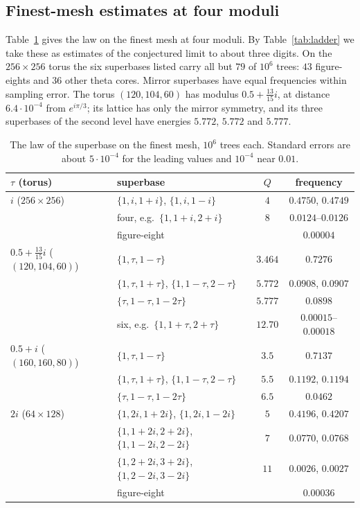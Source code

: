 \documentclass[11pt]{amsart}
\theoremstyle{definition}
\theoremstyle{remark}
\begin{document}
\subsection*{Finest-mesh estimates at four moduli}
Table~\ref{tab:limit} gives the law on the finest mesh at four moduli. By Table~\ref{tab:ladder} we take these as
estimates of the conjectured limit to about three digits. On the $256\times256$ torus the six superbases listed carry
all but $79$ of $10^6$ trees: $43$ figure-eights and $36$ other theta cores. Mirror superbases have equal frequencies
within sampling error. The torus $(120,104,60)$ has modulus $0.5+\tfrac{13}{15}i$, at distance $6.4\cdot10^{-4}$ from
$e^{i\pi/3}$; its lattice has only the mirror symmetry, and its three superbases of the second level have energies
$5.772$, $5.772$ and $5.777$.

\begin{table}[tbp]
\centering
\small
\begin{tabular}{llcc}
\toprule
$\tau$ (torus) & superbase & $Q$ & frequency\\\midrule
$i$ ($256\times256$) & $\{1,i,1+i\}$, $\{1,i,1-i\}$ & $4$ & $0.4750$, $0.4749$\\
 & four, e.g.\ $\{1,1+i,2+i\}$ & $8$ & $0.0124$--$0.0126$\\
 & figure-eight & & $0.00004$\\
$0.5+\tfrac{13}{15}i$ ($(120,104,60)$) & $\{1,\tau,1-\tau\}$ & $3.464$ & $0.7276$\\
 & $\{1,\tau,1+\tau\}$, $\{1,1-\tau,2-\tau\}$ & $5.772$ & $0.0908$, $0.0907$\\
 & $\{\tau,1-\tau,1-2\tau\}$ & $5.777$ & $0.0898$\\
 & six, e.g.\ $\{1,1+\tau,2+\tau\}$ & $12.70$ & $0.00015$--$0.00018$\\
$0.5+i$ ($(160,160,80)$) & $\{1,\tau,1-\tau\}$ & $3.5$ & $0.7137$\\
 & $\{1,\tau,1+\tau\}$, $\{1,1-\tau,2-\tau\}$ & $5.5$ & $0.1192$, $0.1194$\\
 & $\{\tau,1-\tau,1-2\tau\}$ & $6.5$ & $0.0462$\\
$2i$ ($64\times128$) & $\{1,2i,1+2i\}$, $\{1,2i,1-2i\}$ & $5$ & $0.4196$, $0.4207$\\
 & $\{1,1+2i,2+2i\}$, $\{1,1-2i,2-2i\}$ & $7$ & $0.0770$, $0.0768$\\
 & $\{1,2+2i,3+2i\}$, $\{1,2-2i,3-2i\}$ & $11$ & $0.0026$, $0.0027$\\
 & figure-eight & & $0.00036$\\\bottomrule
\end{tabular}
\medskip
\caption{The law of the superbase on the finest mesh, $10^6$ trees each. Standard errors are about $5\cdot10^{-4}$
for the leading values and $10^{-4}$ near $0.01$.}
\label{tab:limit}
\end{table}
\end{document}
